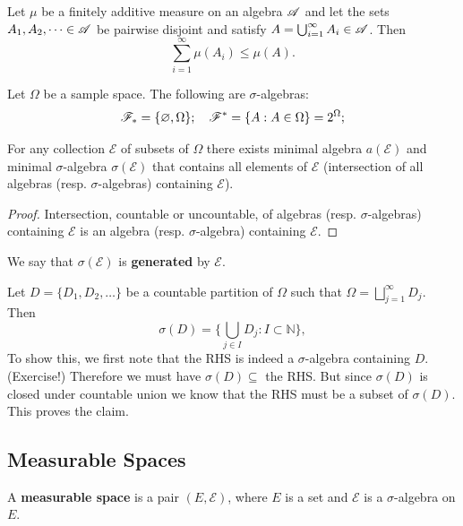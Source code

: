 \begin{proposition}
Let $\mu$ be a finitely additive measure on an algebra $\mathcal{A}$ and let the sets $A_1, A_2, \dots \in \mathcal{A}$ be pairwise disjoint and satisfy $A = \bigcup_{i=1}^\infty A_i \in \mathcal{A}$. Then 
\begin{equation*}
    \sum_{i=1}^\infty \mu (A_i) \le \mu(A).
\end{equation*}
\end{proposition}

\begin{example} 
Let $\Omega$ be a sample space. The following are $\sigma$-algebras:
\begin{equation*}
    \mathcal{F}_* = \{ \varnothing, \Omega \}; \quad \mathcal{F}^* = \{ A: A \in \Omega \} = 2^\Omega;
\end{equation*}
\end{example}

\begin{lemma}
For any collection $\mathcal{E}$ of subsets of $\Omega$ there exists minimal algebra $a (\mathcal{E})$ and minimal $\sigma$-algebra $\sigma(\mathcal{E})$ that contains all elements of $\mathcal{E}$ (intersection of all algebras (resp. $\sigma$-algebras) containing $\mathcal{E}$).
\end{lemma}
\begin{proof}
Intersection, countable or uncountable, of algebras (resp. $\sigma$-algebras) containing $\mathcal{E}$ is an algebra (resp. $\sigma$-algebra) containing $\mathcal{E}$.
\end{proof}
We say that $\sigma (\mathcal{E})$ is \textbf{generated} by $\mathcal{E}$.

\begin{example} Let $D = \{ D_1, D_2, \dots \}$ be a countable partition of $\Omega$ such that $\Omega = \bigsqcup_{j=1}^\infty D_j$. Then
\begin{equation*}
    \sigma(D) = \bigg\{ \bigcup_{j \in I}D_j : I \subset \mathbb{N} \bigg\},
\end{equation*}
To show this, we first note that the RHS is indeed a $\sigma$-algebra containing $D$. (Exercise!) Therefore we must have $\sigma(D) \subseteq$ the RHS. But since $\sigma(D)$ is closed under countable union we know that the RHS must be a subset of $\sigma(D)$. This proves the claim.
\end{example}

\subsection{Measurable Spaces}
\begin{definition}
A \textbf{measurable space} is a pair $(E, \mathcal{E})$, where $E$ is a set and $\mathcal{E}$ is a $\sigma$-algebra on $E$.
\end{definition}
